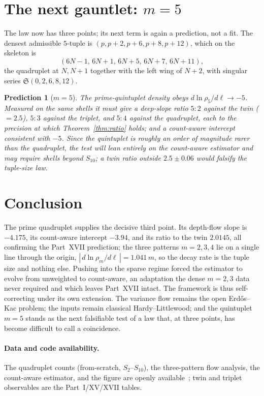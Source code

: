 \documentclass[11pt]{article}
\newtheorem{prediction}{Prediction}
\begin{document}
\section{The next gauntlet: $m=5$}

The law now has three points; its next term is again a prediction, not a fit. The
densest admissible $5$-tuple is $(p,p+2,p+6,p+8,p+12)$, which on the skeleton is
\[
  (6N-1,\,6N+1,\,6N+5,\,6N+7,\,6N+11),
\]
the quadruplet at $N,N+1$ together with the left wing of $N+2$, with singular
series $\mathfrak{S}(0,2,6,8,12)$.

\begin{prediction}[$m=5$]\label{pred:m5}
The prime-quintuplet density obeys $d\ln\rho_5/d\ell\to-5$. Measured on the same
shells it must give a deep-slope ratio $5{:}2$ against the twin ($=2.5$), $5{:}3$
against the triplet, and $5{:}4$ against the quadruplet, each to the precision at
which Theorem~\ref{thm:ratio} holds; and a count-aware intercept consistent with
$-5$. Since the quintuplet is roughly an order of magnitude rarer than the
quadruplet, the test will lean entirely on the count-aware estimator and may
require shells beyond $S_{10}$; a twin ratio outside $2.5\pm0.06$ would falsify the
tuple-size law.
\end{prediction}

\section{Conclusion}

The prime quadruplet supplies the decisive third point. Its depth-flow slope is
$-4.175$, its count-aware intercept $-3.94$, and its ratio to the twin $2.0145$,
all confirming the Part~XVII prediction; the three patterns $m=2,3,4$ lie on a
single line through the origin, $|\,d\ln\rho_m/d\ell\,|=1.041\,m$, so the decay
rate is the tuple size and nothing else. Pushing into the sparse regime forced the
estimator to evolve from unweighted to count-aware, an adaptation the dense
$m=2,3$ data never required and which leaves Part~XVII intact. The framework is
thus self-correcting under its own extension. The variance flow remains the open
Erd\H{o}s--Kac problem; the inputs remain classical Hardy--Littlewood; and the
quintuplet $m=5$ stands as the next falsifiable test of a law that, at three
points, has become difficult to call a coincidence.

\paragraph{Data and code availability.}
The quadruplet counts (from-scratch, $S_2$--$S_{10}$), the three-pattern flow
analysis, the count-aware estimator, and the figure are openly
available~\cite{repo}; twin and triplet observables are the Part~I/XV/XVII tables.
\end{document}
